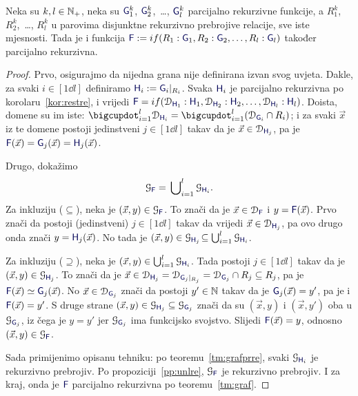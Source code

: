 \begin{teorem}\label{tm:gre}
Neka su $k,l\in{\mathbb N}_+$, neka su $\f G_1^k$, $\f G_2^k$,~\ldots, $\f G_l^k$ parcijalno rekurzivne funkcije, a $R_1^k$, $R_2^k$,~\ldots, $R_l^k$ u parovima disjunktne rekurzivno prebrojive relacije, sve iste mjesnosti. Tada je i funkcija $\f F:=\IF{R_1:\f G_1,R_2:\f G_2,\dots,R_l:\f G_l}$ također parcijalno rekurzivna.
\end{teorem}
\begin{proof}
Prvo, osigurajmo da nijedna grana nije definirana izvan svog uvjeta. Dakle, za svaki $i\in[1\dd l]$ definiramo $\f H_i:=\f G_i|_{R_i}$. Svaka $\f H_i$ je parcijalno rekurzivna po korolaru~\ref{kor:restre}, i vrijedi $\f F=\IF{\dom{\f H_1}:\f H_1,\dom{\f H_2}:\f H_2,\dots,\dom{\f H_l}:\f H_l}$. Doista, domene su im iste: $\bdcup_{i=1}^l\dom{\f H_i}=\bdcup_{i=1}^l(\dom{\f G_i}\cap R_i)$; i za svaki $\vec x$ iz te domene postoji jedinstveni $j\in[1\dd l]$ takav da je $\vec x\in\dom{\f H_{j}}$, pa je $\f F(\vec x)=\f G_{j}(\vec x)=\f H_{j}(\vec x)$.

Drugo, dokažimo
\begin{equation}
    \graf{\f F}=\,\bigcup\nolimits_{i=1}^l\graf{\f H_i}\text.
\end{equation}
Za inkluziju ($\subseteq$), neka je $(\vec x,y)\in\graf{\f F}$. To znači da je $\vec x\in\dom{\f F}$ i $y=\f F(\vec x)$. Prvo znači da postoji (jedinstveni) $j\in[1\dd l]$ takav da vrijedi $\vec x\in\dom{\f H_{j}}$, pa ovo drugo onda znači $y=\f H_{j}(\vec x)$. No tada je $(\vec x,y)\in\graf{\f H_{j}}\!\subseteq\bigcup_{i=1}^l\graf{\f H_i}$.

Za inkluziju ($\supseteq$), neka je $(\vec x,y)\in\bigcup_{i=1}^l\graf{\f H_i}$. Tada postoji $j\in[1\dd l]$ takav da je $(\vec x,y)\in\graf{\f H_j}$. To znači da je $\vec x\in\dom{\f H_j}=\dom{\f G_j|_{R_j}}=\dom{\f G_j}\cap R_j\subseteq R_j$, pa je $\f F(\vec x)\simeq\f G_j(\vec x)$. No $\vec x\in\dom{\f G_j}$ znači da postoji $y'\in{\mathbb N}$ takav da je $\f G_j(\vec x)=y'$, pa je i $\f F(\vec x)=y'$. S druge strane $(\vec x,y)\in\graf{\f H_j}\subseteq\graf{\f G_j}$ znači da su $(\vec x,y)$ i $(\vec x,y')$ oba u $\graf{\f G_j}$, iz čega je $y=y'$ jer $\graf{\f G_j}$ ima funkcijsko svojstvo. Slijedi $\f F(\vec x)=y$, odnosno $(\vec x,y)\in\graf{\f F}$.

Sada primijenimo opisanu tehniku: po teoremu~\ref{tm:grafprre}, svaki $\graf{\f H_i}$ je rekurzivno prebrojiv. Po propoziciji~\ref{pp:unlre}, $\graf{\f F}$ je rekurzivno prebrojiv. I za kraj, onda je $\f F$ parcijalno rekurzivna po teoremu~\ref{tm:graf}.
\end{proof}

